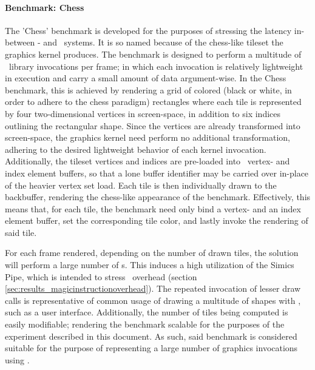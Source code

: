 \paragraph{Benchmark: Chess}
\label{par:experimentalmethodology_benchmarking_benchmarkchess}
The 'Chess' benchmark is developed for the purposes of stressing the latency in-between \dvttermtarget - and \dvttermhost\ systems.
It is so named because of the chess-like tileset the graphics kernel produces.
The benchmark is designed to perform a multitude of \dvttermopenglestwopointo\ library invocations per frame; in which each invocation is relatively lightweight in execution and carry a small amount of data argument-wise.
In the Chess benchmark, this is achieved by rendering a grid of colored (black or white, in order to adhere to the chess paradigm) rectangles where each tile is represented by four two-dimensional vertices in screen-space, in addition to six indices outlining the rectangular shape.
Since the vertices are already transformed into screen-space, the graphics kernel need perform no additional transformation, adhering to the desired lightweight behavior of each kernel invocation.
Additionally, the tileset vertices and indices are pre-loaded into \dvttermopengl\ vertex- and index element buffers, so that a lone buffer identifier may be carried over in-place of the heavier vertex set load.
Each tile is then individually drawn to the backbuffer, rendering the chess-like appearance of the benchmark.
Effectively, this means that, for each tile, the benchmark need only bind a vertex- and an index element buffer, set the corresponding tile color, and lastly invoke the rendering of said tile.

For each frame rendered, depending on the number of drawn tiles, the solution will perform a large number of \dvttermmagicinstruction s.
This induces a high utilization of the Simics Pipe, which is intended to stress \dvttermmagicinstruction\ overhead (section \ref{sec:results_magicinstructionoverhead}).
The repeated invocation of lesser draw calls is representative of common usage of drawing a multitude of shapes with \dvttermopengl , such as a user interface. Additionally, the number of tiles being computed is easily modifiable; rendering the benchmark scalable for the purposes of the experiment described in this document. As such, said benchmark is considered suitable for the purpose of representing a large number of graphics invocations using \dvttermopenglestwopointo .

